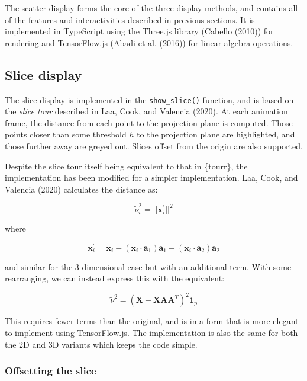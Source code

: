 The scatter display forms the core of the three display methods, and contains all of the features and interactivities described in previous sections. It is implemented in TypeScript using the Three.js library (Cabello (2010)) for rendering and TensorFlow.js (Abadi et al. (2016)) for linear algebra operations.

\hypertarget{slice-display}{%
\subsection{Slice display}\label{slice-display}}

The slice display is implemented in the \texttt{show\_slice()} function, and is based on the \emph{slice tour} described in Laa, Cook, and Valencia (2020). At each animation frame, the distance from each point to the projection plane is computed. Those points closer than some threshold \(h\) to the projection plane are highlighted, and those further away are greyed out. Slices offset from the origin are also supported.

Despite the slice tour itself being equivalent to that in \{tourr\}, the implementation has been modified for a simpler implementation. Laa, Cook, and Valencia (2020) calculates the distance as:

\[
\tilde \nu_i^2 = ||\mathbf{x}_i^\prime||^2
\label{eq:nu}
\]

where

\begin{equation}
\mathbf{x}_i^\prime = \mathbf{x}_i - 
  (\mathbf{x}_i \cdot \mathbf{a}_1)\mathbf{a}_1 - 
  (\mathbf{x}_i \cdot \mathbf{a}_2)\mathbf{a}_2
\label{eq:xprime}
\end{equation}

and similar for the 3-dimensional case but with an additional term. With some rearranging, we can instead express this with the equivalent:

\begin{equation}
\tilde \nu^2 = (\mathbf{X} - \mathbf{XAA}^T)^2 \mathbf{1}_p
\label{eq:nu2}
\end{equation}

This requires fewer terms than the original, and is in a form that is more elegant to implement using TensorFlow.js. The implementation is also the same for both the 2D and 3D variants which keeps the code simple.

\hypertarget{offsetting-the-slice}{%
\subsubsection{Offsetting the slice}\label{offsetting-the-slice}}

